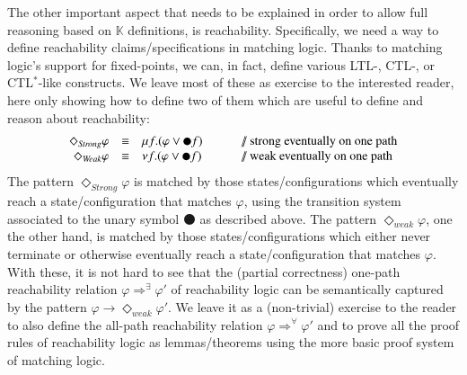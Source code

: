 \documentclass[UTF8,11pt]{article}
\theoremstyle{plain}
\theoremstyle{definition}
\theoremstyle{remark}
\newcommand{\K}{\mbox{$\mathbb{K}$}\xspace}
\newcommand{\snext}{{\medbullet}}
\newcommand{\doubleslash}{/\!/{ }}
\begin{document}
The other important aspect that needs to be explained in order to allow
full reasoning based on \K definitions, is reachability.
Specifically, we need a way to define reachability claims/specifications
in matching logic.
Thanks to matching logic's support for fixed-points, we can, in fact,
define various LTL-, CTL-, or CTL$^*$-like constructs.
We leave most of these as exercise to the interested reader,
here only showing how to define two of them which are useful to define
and reason about reachability:
$$
\begin{array}{rcl@{\hspace*{7ex}}l}
\Diamond_{\textit{Strong}} \varphi & \equiv & \mu f . (\varphi \vee \snext f)
& \textrm{\doubleslash strong eventually on one path}
\\
\Diamond_{\textit{Weak}} \varphi & \equiv & \nu f . (\varphi \vee \snext f)
& \textrm{\doubleslash weak eventually on one path}
\end{array}
$$
The pattern $\Diamond_{\textit{Strong}}\varphi$ is matched by those
states/configurations which eventually reach a state/configuration that
matches $\varphi$, using the transition system associated to the unary
symbol $\snext$ as described above.
The pattern $\Diamond_{\textit{weak}}\varphi$, one the other hand, is matched
by those states/configurations which either never terminate or otherwise
eventually reach a state/configuration that matches $\varphi$.
With these, it is not hard to see that the (partial correctness) one-path
reachability relation $\varphi \Rightarrow^\exists \varphi'$ of reachability
logic \cite{stefanescu-park-yuwen-li-rosu-2016-oopsla} can be semantically
captured by the pattern
$\varphi \rightarrow \Diamond_{\textit{weak}}\varphi'$.
We leave it as a (non-trivial) exercise to the reader to also define the
all-path reachability relation $\varphi \Rightarrow^\forall\varphi'$ and to
prove all the proof rules of reachability logic as lemmas/theorems using the
more basic proof system of matching logic.
\end{document}
